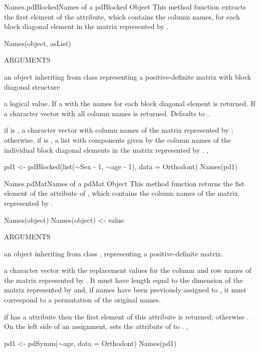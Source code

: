 \documentclass[pdftex]{article} \usepackage{url,graphicx}
\renewcommand{\Twiddle}{\mbox{\(\sim\)}}
\begin{document}
\begin{Helpfile}{Names.pdBlocked}{Names of a pdBlocked Object}
This method function extracts the first element of the 
attribute, which contains the column names, for each block diagonal
element in the matrix represented by .
\begin{Example}
Names(object, asList)
\end{Example}
\begin{Argument}{ARGUMENTS}
\item[\Co{object:}]
an object inheriting from class 
representing a positive-definite matrix with block diagonal
structure
\item[\Co{asList:}]
a logical value. If  a  with the
names for each block diagonal element is returned. If 
a character vector with all column names is returned. Defaults to
.
\end{Argument}
if  is , a character vector with column names
of the matrix represented by ; otherwise, if
 is , a list with components given by the
column names of the individual block diagonal elements in the matrix
represented by .
, 
\need 15pt
\vspace{-16pt} 
\begin{Example}
pd1 <- pdBlocked(list(\Twiddle Sex - 1, \Twiddle age - 1), data = Orthodont)
Names(pd1)
\end{Example}
\end{Helpfile}
\begin{Helpfile}{Names.pdMat}{Names of a pdMat Object}
This method function returns the fist element of the 
attribute of , which contains the column names of the
matrix represented by .
\begin{Example}
Names(object)
Names(object) <- value
\end{Example}
\begin{Argument}{ARGUMENTS}
\item[\Co{object:}]
an object inheriting from class ,
representing a positive-definite matrix.
\item[\Co{value:}]
a character vector with the replacement values for the
column and row names of the matrix represented by . It
must have length equal to the dimension of the matrix
represented by  and, if names have been previously
assigned to , it must correspond to a permutation of the
original names.
\end{Argument}
if  has a  attribute then the first
element of this attribute is returned; otherwise .
On the left side of an assignment, sets the  attribute
of  to .
, 
\need 15pt
\vspace{-16pt} 
\begin{Example}
pd1 <- pdSymm(\Twiddle age, data = Orthodont)
Names(pd1)
\end{Example}
\end{Helpfile}
\end{document}
